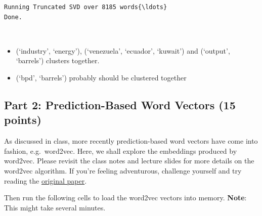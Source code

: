 \documentclass[11pt]{article}
\providecommand{\tightlist}{%
      \setlength{\itemsep}{0pt}\setlength{\parskip}{0pt}}
\begin{document}
    \begin{Verbatim}[commandchars=\\\{\}]
Running Truncated SVD over 8185 words{\ldots}
Done.

    \end{Verbatim}

    \begin{center}
    \end{center}
    { \hspace*{\fill} \\}
    
    \begin{itemize}
\tightlist
\item
  (`industry', `energy'), (`venezuela', `ecuador', `kuwait') and
  (`output', `barrels') clusters together.
\item
  (`bpd', `barrels') probably should be clustered together
\end{itemize}

    \hypertarget{part-2-prediction-based-word-vectors-15-points}{%
\subsection{Part 2: Prediction-Based Word Vectors (15
points)}\label{part-2-prediction-based-word-vectors-15-points}}

As discussed in class, more recently prediction-based word vectors have
come into fashion, e.g.~word2vec. Here, we shall explore the embeddings
produced by word2vec. Please revisit the class notes and lecture slides
for more details on the word2vec algorithm. If you're feeling
adventurous, challenge yourself and try reading the
\href{https://papers.nips.cc/paper/5021-distributed-representations-of-words-and-phrases-and-their-compositionality.pdf}{original
paper}.

Then run the following cells to load the word2vec vectors into memory.
\textbf{Note}: This might take several minutes.
\end{document}
